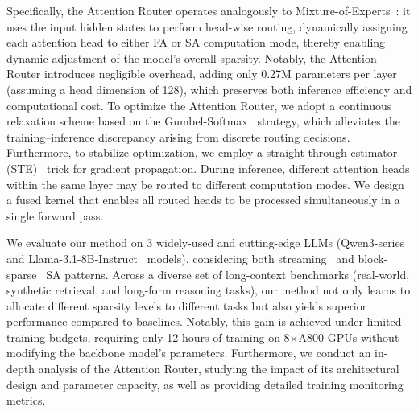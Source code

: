 Specifically, the Attention Router operates analogously to Mixture-of-Experts~\citep{shazeer2017outrageously}: it uses the input hidden states to perform head-wise routing, dynamically assigning each attention head to either FA or SA computation mode, thereby enabling dynamic adjustment of the model's overall sparsity.
Notably, the Attention Router introduces negligible overhead, adding only 0.27M parameters per layer (assuming a head dimension of 128), which preserves both inference efficiency and computational cost.
To optimize the Attention Router, we adopt a continuous relaxation scheme based on the Gumbel-Softmax~\citep {jang2016categorical} strategy, which alleviates the training–inference discrepancy arising from discrete routing decisions.
Furthermore, to stabilize optimization, we employ a straight-through estimator (STE)~\citep{bengio2013estimating} trick for gradient propagation.
During inference, different attention heads within the same layer may be routed to different computation modes.
We design a fused kernel that enables all routed heads to be processed simultaneously in a single forward pass.

We evaluate our method on 3 widely-used and cutting-edge LLMs (Qwen3-series~\citep{yang2025qwen3technicalreport} and Llama-3.1-8B-Instruct~\citep{grattafiori2024llama} models), considering both streaming~\citep{streamingllm} and block-sparse~\citep{guo2024blocksparse} SA patterns.
Across a diverse set of long-context benchmarks (real-world, synthetic retrieval, and long-form reasoning tasks), our method not only learns to allocate different sparsity levels to different tasks but also yields superior performance compared to baselines.
Notably, this gain is achieved under limited training budgets, requiring only 12 hours of training on 8$\times$A800 GPUs without modifying the backbone model's parameters.
Furthermore, we conduct an in-depth analysis of the Attention Router, studying the impact of its architectural design and parameter capacity, as well as providing detailed training monitoring metrics.
